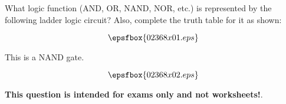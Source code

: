 

What logic function (AND, OR, NAND, NOR, etc.) is represented by the following ladder logic circuit?  Also, complete the truth table for it as shown:

$$\epsfbox{02368x01.eps}$$







This is a NAND gate.

$$\epsfbox{02368x02.eps}$$







{\bf This question is intended for exams only and not worksheets!}.




